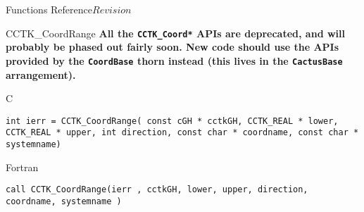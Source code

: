 \begin{cactuspart}{ Functions Reference}{}{$Revision$}
\begin{FunctionDescription}{CCTK\_CoordRange}
{\textbf{All the \texttt{CCTK\_Coord*} APIs are deprecated,
and will probably be phased out fairly soon.
New code should use the APIs provided by the \texttt{CoordBase} thorn
instead (this lives in the \texttt{CactusBase} arrangement).}
}
\label{CCTK-CoordRange}
\begin{SynopsisSection}
\begin{Synopsis}{C}
\begin{verbatim}int ierr = CCTK_CoordRange( const cGH * cctkGH, CCTK_REAL * lower, CCTK_REAL * upper, int direction, const char * coordname, const char * systemname)\end{verbatim}
\end{Synopsis}
\begin{Synopsis}{Fortran}
\begin{verbatim}call CCTK_CoordRange(ierr , cctkGH, lower, upper, direction, coordname, systemname )


\end{verbatim}
\end{Synopsis}
\end{SynopsisSection}
\end{FunctionDescription}
\end{cactuspart}
